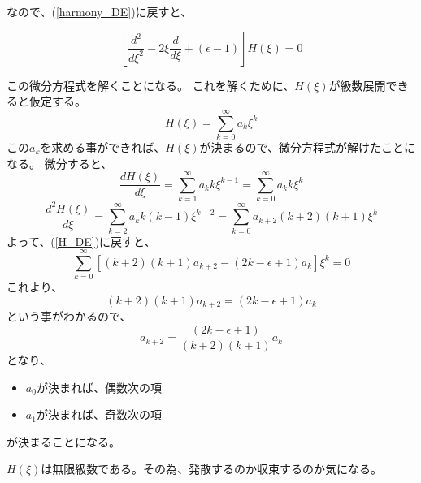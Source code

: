 なので、(\ref{harmony_DE})に戻すと、

\begin{equation}
  \label{H_DE}
  \left[\dfrac{d^2}{d\xi^2} -2\xi\dfrac{d}{d\xi} + (\epsilon -1)\right]H(\xi) = 0
\end{equation}

この微分方程式を解くことになる。
これを解くために、$H(\xi)$が級数展開できると仮定する。
\begin{equation}
  H(\xi) = \sum_{k=0}^{\infty}a_k \xi^k
\end{equation}
この$a_k$を求める事ができれば、$H(\xi)$が決まるので、微分方程式が解けたことになる。
微分すると、
\begin{equation}
  \dfrac{d H(\xi)}{d\xi} = \sum_{k=1}^{\infty}a_k k\xi^{k-1} = \sum_{k=0}^{\infty}a_k k\xi^k
\end{equation}
\begin{equation}
  \dfrac{d^2 H(\xi)}{d\xi} = \sum_{k=2}^{\infty}a_k k(k-1)\xi^{k-2} = \sum_{k=0}^{\infty}a_{k+2} (k+2)(k+1)\xi^k
\end{equation}
よって、(\ref{H_DE})に戻すと、
\begin{equation}
  \sum_{k=0}^{\infty} \left[ (k+2)(k+1)a_{k+2} - (2k - \epsilon + 1)a_k  \right] \xi^k = 0
\end{equation}
これより、
\begin{equation}
  (k+2)(k+1)a_{k+2} = (2k - \epsilon + 1)a_k
\end{equation}
という事がわかるので、
\begin{equation}
  \label{recurrence_relation_1}
  a_{k+2} = \dfrac{(2k - \epsilon + 1)}{(k+2)(k+1)}a_k
\end{equation}
となり、
\begin{itemize}
\item $a_0$が決まれば、偶数次の項
\item $a_1$が決まれば、奇数次の項
\end{itemize}
が決まることになる。

$H(\xi)$は無限級数である。その為、発散するのか収束するのか気になる。

